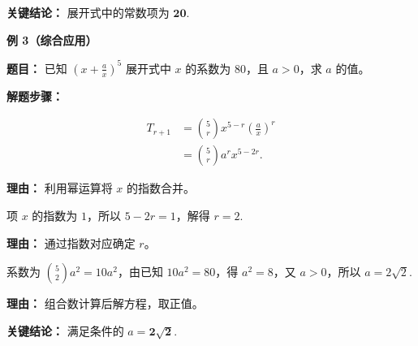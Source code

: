 \begin{examplebox}
	\textbf{\textcolor{CExample}{关键结论：}}
	展开式中的常数项为 $\mathbf{20}$.

	\medskip
	\textbf{\textcolor{CExample}{例 3（综合应用）}}

	\textbf{\textcolor{CExample}{题目：}}
	已知 $\left(x+\frac{a}{x}\right)^{5}$ 展开式中 $x$ 的系数为 $80$，且 $a>0$，求 $a$ 的值。

	\textbf{\textcolor{CExample}{解题步骤：}}
	\begin{description}[style=nextline, leftmargin=2.8em, labelsep=0.5em, itemsep=0.45em]
		\item[\textbf{第一步（写通项并化简）：}]
			\[
				\begin{aligned}
					T_{r+1} &= \binom{5}{r} x^{5-r} \left(\frac{a}{x}\right)^{r} \\
					&= \binom{5}{r} a^{r} x^{5-2r}.
			\end{aligned}
			\]
			\par\textbf{理由：} 利用幂运算将 $x$ 的指数合并。
		\item[\textbf{第二步（确定 $r$ 值）：}]
			项 $x$ 的指数为 $1$，所以 $5-2r=1$，解得 $r=2$.
			\par\textbf{理由：} 通过指数对应确定 $r$。
		\item[\textbf{第三步（列方程求 $a$）：}]
			系数为 $\binom{5}{2}a^{2}=10a^{2}$，由已知 $10a^{2}=80$，得 $a^{2}=8$，又 $a>0$，所以 $a=2\sqrt{2}$.
			\par\textbf{理由：} 组合数计算后解方程，取正值。
	\end{description}

	\textbf{\textcolor{CExample}{关键结论：}}
	满足条件的 $a = \mathbf{2\sqrt{2}}$.
\end{examplebox}